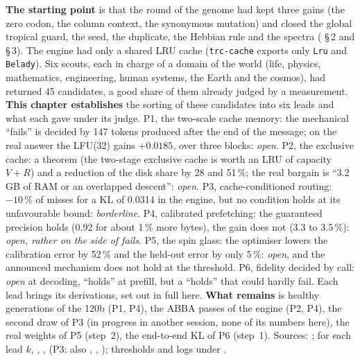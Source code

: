 \begin{origine}
\textbf{The starting point} is that the round of the genome had kept three gains (the zero codon, the column context, the synonymous mutation) and closed the global tropical guard, the seed, the duplicate, the Hebbian rule and the spectra ( §\,2 and §\,3). The engine had only a shared LRU cache (\texttt{trc-cache} exports only \texttt{Lru} and \texttt{Belady}). Six scouts, each in charge of a domain of the world (life, physics, mathematics, engineering, human systems, the Earth and the cosmos), had returned 45 candidates, a good share of them already judged by a measurement.
\textbf{This chapter establishes} the sorting of these candidates into six leads and what each gave under its judge. P1, the two-scale cache memory: the mechanical ``fails'' is decided by 147 tokens produced after the end of the message; on the real answer the LFU(32) gains $+0.0185$, over three blocks: \emph{open}. P2, the exclusive cache: a theorem (the two-stage exclusive cache is worth an LRU of capacity $V+R$) and a reduction of the disk share by 28 and 51\,\%; the real bargain is ``3.2\,GB of RAM or an overlapped descent'': \emph{open}. P3, cache-conditioned routing: $-10\,\%$ of misses for a KL of 0.0314 in the engine, but no condition holds at its unfavourable bound: \emph{borderline}. P4, calibrated prefetching: the guaranteed precision holds (0.92 for about 1\,\% more bytes), the gain does not (3.3 to 3.5\,\%): \emph{open, rather on the side of fails}. P5, the spin glass: the optimiser lowers the calibration error by 52\,\% and the held-out error by only 5\,\%: \emph{open}, and the announced mechanism does not hold at the threshold. P6, fidelity decided by call: \emph{open} at decoding, ``holds'' at prefill, but a ``holds'' that could hardly fail. Each lead brings its derivations, set out in full here.
\textbf{What remains} is healthy generations of the 120b (P1, P4), the ABBA passes of the engine (P2, P4), the second draw of P3 (in progress in another session, none of its numbers here), the real weights of P5 (step~2), the end-to-end KL of P6 (step~1).
Sources: ; for each lead $k$, , ,  (P3: also , , ); thresholds and logs under .
\end{origine}


